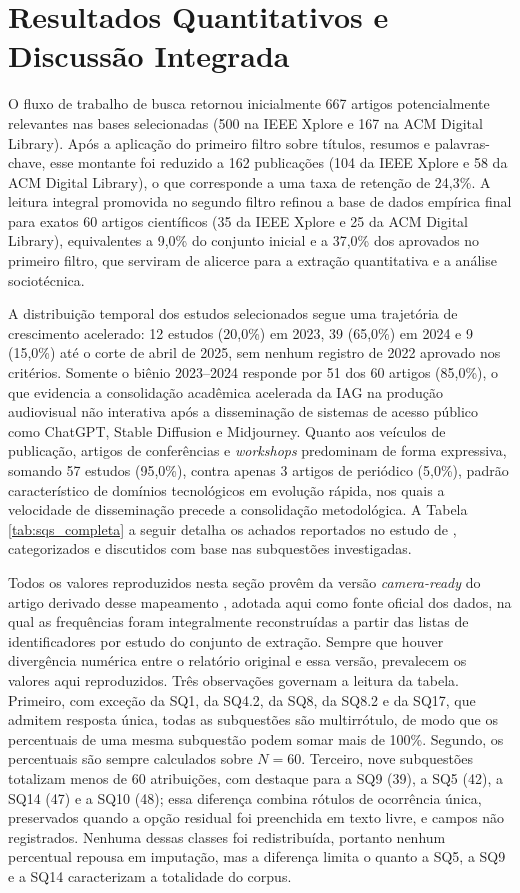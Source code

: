 \section{Resultados Quantitativos e Discussão Integrada}

O fluxo de trabalho de busca retornou inicialmente 667 artigos potencialmente relevantes nas bases selecionadas (500 na IEEE Xplore e 167 na ACM Digital Library). Após a aplicação do primeiro filtro sobre títulos, resumos e palavras-chave, esse montante foi reduzido a 162 publicações (104 da IEEE Xplore e 58 da ACM Digital Library), o que corresponde a uma taxa de retenção de 24,3\%. A leitura integral promovida no segundo filtro refinou a base de dados empírica final para exatos 60 artigos científicos (35 da IEEE Xplore e 25 da ACM Digital Library), equivalentes a 9,0\% do conjunto inicial e a 37,0\% dos aprovados no primeiro filtro, que serviram de alicerce para a extração quantitativa e a análise sociotécnica.

A distribuição temporal dos estudos selecionados segue uma trajetória de crescimento acelerado: 12 estudos (20,0\%) em 2023, 39 (65,0\%) em 2024 e 9 (15,0\%) até o corte de abril de 2025, sem nenhum registro de 2022 aprovado nos critérios. Somente o biênio 2023--2024 responde por 51 dos 60 artigos (85,0\%), o que evidencia a consolidação acadêmica acelerada da IAG na produção audiovisual não interativa após a disseminação de sistemas de acesso público como ChatGPT, Stable Diffusion e Midjourney. Quanto aos veículos de publicação, artigos de conferências e \textit{workshops} predominam de forma expressiva, somando 57 estudos (95,0\%), contra apenas 3 artigos de periódico (5,0\%), padrão característico de domínios tecnológicos em evolução rápida, nos quais a velocidade de disseminação precede a consolidação metodológica. A Tabela \ref{tab:sqs_completa} a seguir detalha os achados reportados no estudo de \citet{RothAleo2026}, categorizados e discutidos com base nas subquestões investigadas.

Todos os valores reproduzidos nesta seção provêm da versão \textit{camera-ready} do artigo derivado desse mapeamento \citep{RothPereiraValentim2026}, adotada aqui como fonte oficial dos dados, na qual as frequências foram integralmente reconstruídas a partir das listas de identificadores por estudo do conjunto de extração. Sempre que houver divergência numérica entre o relatório original \citep{RothAleo2026} e essa versão, prevalecem os valores aqui reproduzidos. Três observações governam a leitura da tabela. Primeiro, com exceção da SQ1, da SQ4.2, da SQ8, da SQ8.2 e da SQ17, que admitem resposta única, todas as subquestões são multirrótulo, de modo que os percentuais de uma mesma subquestão podem somar mais de 100\%. Segundo, os percentuais são sempre calculados sobre $N = 60$. Terceiro, nove subquestões totalizam menos de 60 atribuições, com destaque para a SQ9 (39), a SQ5 (42), a SQ14 (47) e a SQ10 (48); essa diferença combina rótulos de ocorrência única, preservados quando a opção residual foi preenchida em texto livre, e campos não registrados. Nenhuma dessas classes foi redistribuída, portanto nenhum percentual repousa em imputação, mas a diferença limita o quanto a SQ5, a SQ9 e a SQ14 caracterizam a totalidade do corpus.

